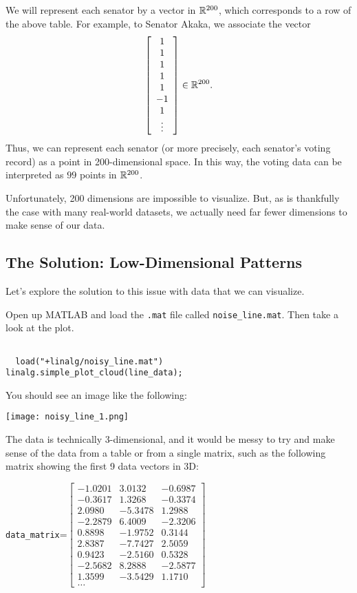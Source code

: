 \documentclass{ximera}
\begin{document}
We will represent each senator by a vector in $\R^{200}$, which
corresponds to a row of the above table. For example, to Senator
Akaka, we associate the vector
\begin{equation*}
  \startmat{c} 1 \\ 1 \\ 1 \\ 1 \\ 1 \\ -1 \\ 1 \\ \vdots \stopmat
  \in\R^{200}.
\end{equation*}
Thus, we can represent each senator (or more precisely, each senator's
voting record) as a point in 200-dimensional space. In this way, the
voting data can be interpreted as $99$ points in $\R^{200}$.

Unfortunately, 200 dimensions are impossible to visualize. But, as is thankfully the case with many real-world datasets, we actually need far fewer dimensions to make sense of our data. 

\subsection*{The Solution: Low-Dimensional Patterns}

Let's explore the solution to this issue with data that we can visualize. 

Open up MATLAB and load the \texttt{.mat} file called \texttt{noise\_line.mat}. Then take a look at the plot.

\begin{verbatim}

  load("+linalg/noisy_line.mat")
linalg.simple_plot_cloud(line_data);

\end{verbatim}

You should see an image like the following:

\begin{center}
  \texttt{[image: noisy\_line\_1.png]}
\end{center}

The data is technically 3-dimensional, and it would be messy to try and make sense of the data from a table or from a single matrix, such as the following matrix showing the first 9 data vectors in 3D:

\texttt{data\_matrix}=$\begin{bmatrix}
-1.0201 & 3.0132  & -0.6987 \\
-0.3617 & 1.3268  & -0.3374 \\
2.0980  & -5.3478 & 1.2988  \\
-2.2879 & 6.4009  & -2.3206 \\
0.8898  & -1.9752 & 0.3144  \\
2.8387  & -7.7427 & 2.5059  \\
0.9423  & -2.5160 & 0.5328  \\
-2.5682 & 8.2888  & -2.5877 \\
1.3599  & -3.5429 & 1.1710\\
\ldots
\end{bmatrix}$
\end{document}
